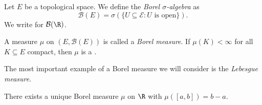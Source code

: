 \documentclass[a4paper]{article}
\begin{document}
\begin{defi}
  Let $E$ be a topological space. We define the \emph{Borel $\sigma$-algebra} as
  \[
    \mathcal{B}(E) = \sigma(\{U \subseteq \mathcal{E}: U \text{ is open}\}).
  \]
  We write  for $\mathcal{B}(\R)$.
\end{defi}

\begin{defi}
  A measure $\mu$ on $(E, \mathcal{B}(E))$ is called a \emph{Borel measure}. If $\mu(K) < \infty$ for all $K \subseteq E$ compact, then $\mu$ is a .
\end{defi}
The most important example of a Borel measure we will consider is the \emph{Lebesgue measure}.

\begin{thm}
  There exists a unique Borel measure $\mu$ on $\R$ with $\mu([a, b]) = b - a$.
\end{thm}
\end{document}
